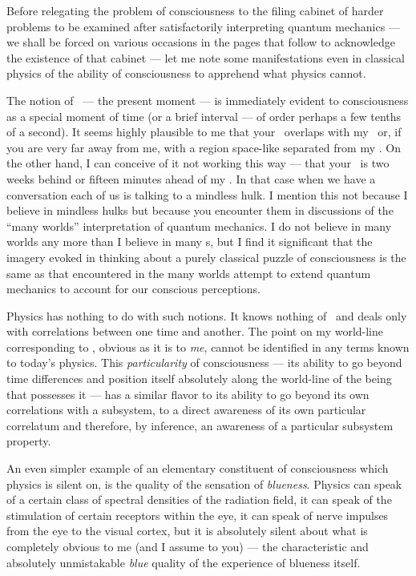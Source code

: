 Before relegating the problem of consciousness to the filing
cabinet of harder problems to be examined after satisfactorily
interpreting quantum mechanics --- we shall be forced on various
occasions in the pages that follow to acknowledge the existence of that
cabinet --- let me note some manifestations even in classical physics
of the ability of consciousness to apprehend what physics
cannot.  

The notion of \now\ --- the present moment --- is immediately
evident to consciousness as a special moment of time (or a brief
interval --- of order perhaps a few tenths of a second).  It seems
highly plausible to me that your
\now\ overlaps with my
\now\ or, if you are very far away from me, with a region space-like
separated from my
\now.  On the other hand, I can conceive of it not working this way
--- that your \now\ is two weeks behind or fifteen minutes ahead of my
\now.  In that case when we have a conversation each of us is talking
to a mindless hulk.  I mention this not because I believe in mindless
hulks but because you encounter them in discussions of the ``many
worlds'' interpretation of quantum mechanics.  I do not believe in
many worlds any more than I believe in many \now s, but I find it
significant that the imagery evoked in thinking about a purely
classical puzzle of consciousness is the same as that encountered in
the many worlds attempt to extend quantum mechanics to account for our
conscious perceptions.\fn 

Physics has nothing to do with such notions.  It knows nothing of
\now\ and deals only with correlations between one time and another.
The point on my world-line corresponding to \now, obvious as it is to
{\it me\/}, cannot be identified in any terms known to today's
physics.  This {\it particularity\/} of consciousness --- its ability
to go beyond time differences and position itself absolutely along the
world-line of the being that possesses it --- has a similar flavor to
its ability to go beyond its own correlations with a subsystem, to a
direct awareness of its own particular correlatum and therefore, by
inference, an awareness of a particular subsystem
property.\fn

An even simpler example of an elementary constituent of consciousness
which physics is silent on, is the quality of the sensation
of {\it blueness\/}.  Physics can speak of a certain class of
spectral densities of the radiation field, it can speak of the
stimulation of certain receptors within the eye, it can speak of nerve
impulses from the eye to the visual cortex, but it is absolutely
silent about what is completely obvious to me (and I assume to you)
--- the characteristic and absolutely unmistakable {\it blue\/} quality
of the experience of blueness itself.\fn  

